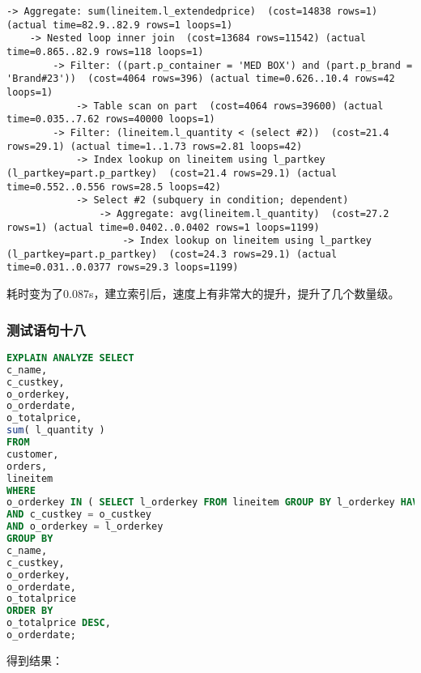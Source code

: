 \documentclass{article}
\begin{document}
\begin{lstlisting}
-> Aggregate: sum(lineitem.l_extendedprice)  (cost=14838 rows=1) (actual time=82.9..82.9 rows=1 loops=1)
    -> Nested loop inner join  (cost=13684 rows=11542) (actual time=0.865..82.9 rows=118 loops=1)
        -> Filter: ((part.p_container = 'MED BOX') and (part.p_brand = 'Brand#23'))  (cost=4064 rows=396) (actual time=0.626..10.4 rows=42 loops=1)
            -> Table scan on part  (cost=4064 rows=39600) (actual time=0.035..7.62 rows=40000 loops=1)
        -> Filter: (lineitem.l_quantity < (select #2))  (cost=21.4 rows=29.1) (actual time=1..1.73 rows=2.81 loops=42)
            -> Index lookup on lineitem using l_partkey (l_partkey=part.p_partkey)  (cost=21.4 rows=29.1) (actual time=0.552..0.556 rows=28.5 loops=42)
            -> Select #2 (subquery in condition; dependent)
                -> Aggregate: avg(lineitem.l_quantity)  (cost=27.2 rows=1) (actual time=0.0402..0.0402 rows=1 loops=1199)
                    -> Index lookup on lineitem using l_partkey (l_partkey=part.p_partkey)  (cost=24.3 rows=29.1) (actual time=0.031..0.0377 rows=29.3 loops=1199)
\end{lstlisting}

耗时变为了0.087s，建立索引后，速度上有非常大的提升，提升了几个数量级。

\subsubsection{测试语句十八}

\begin{lstlisting}[language=sql]
EXPLAIN ANALYZE SELECT
c_name,
c_custkey,
o_orderkey,
o_orderdate,
o_totalprice,
sum( l_quantity ) 
FROM
customer,
orders,
lineitem 
WHERE
o_orderkey IN ( SELECT l_orderkey FROM lineitem GROUP BY l_orderkey HAVING sum( l_quantity ) > 300 ) 
AND c_custkey = o_custkey 
AND o_orderkey = l_orderkey 
GROUP BY
c_name,
c_custkey,
o_orderkey,
o_orderdate,
o_totalprice 
ORDER BY
o_totalprice DESC,
o_orderdate;
\end{lstlisting}

得到结果：
\end{document}
